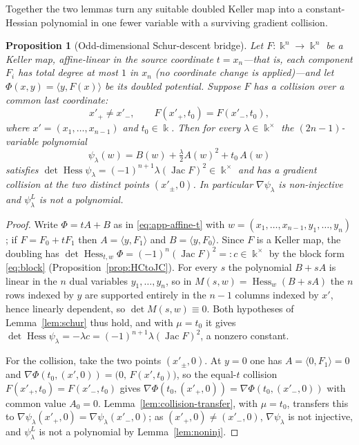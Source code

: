 \documentclass[11pt]{article}
\theoremstyle{plain}
\newtheorem{proposition}[theorem]{Proposition}
\theoremstyle{definition}
\newcommand{\kk}{\Bbbk}
\newcommand{\Hess}{\operatorname{Hess}}
\newcommand{\Jac}{\operatorname{Jac}}
\begin{document}
Together the two lemmas turn any suitable doubled Keller map into a
constant-Hessian polynomial in one fewer variable with a surviving
gradient collision.

\begin{proposition}[Odd-dimensional Schur-descent bridge]
\label{prop:bridge}
Let $F\colon\kk^{n}\to\kk^{n}$ be a Keller map, affine-linear in the
source coordinate $t=x_n$---that is, each component $F_i$ has total
degree at most $1$ in $x_n$ (no coordinate change is applied)---and let
$\Phi(x,y)=\langle y,F(x)\rangle$ be its doubled potential. Suppose $F$ has a collision over a common last
coordinate:
\[
x'_+\ne x'_-,\qquad F(x'_+,t_0)=F(x'_-,t_0),
\]
where $x'=(x_1,\dots,x_{n-1})$ and $t_0\in\kk$. Then for every
$\lambda\in\kk^{\times}$ the $(2n-1)$-variable polynomial
\[
\psi_{\lambda}(w)=B(w)+\tfrac{\lambda}{2}A(w)^{2}+t_0\,A(w)
\]
satisfies $\det\Hess\psi_{\lambda}=(-1)^{n+1}\lambda(\Jac F)^{2}
\in\kk^{\times}$ and has a gradient collision at the two distinct points
$(x'_\pm,0)$. In particular $\nabla\psi_{\lambda}$ is non-injective and
$\psi_{\lambda}^{L}$ is not a polynomial.
\end{proposition}

\begin{proof}
Write $\Phi=tA+B$ as in \eqref{eq:app-affine-t} with
$w=(x_1,\dots,x_{n-1},y_1,\dots,y_n)$; if $F=F_0+tF_1$ then
$A=\langle y,F_1\rangle$ and $B=\langle y,F_0\rangle$. Since $F$ is a
Keller map, the doubling has $\det\Hess_{t,w}\Phi=(-1)^{n}(\Jac F)^{2}
=:c\in\kk^{\times}$ by the block form \eqref{eq:block}
(Proposition~\ref{prop:HCtoJC}). For every $s$ the polynomial $B+sA$ is
linear in the $n$ dual variables $y_1,\dots,y_n$, so in
$M(s,w)=\Hess_w(B+sA)$ the $n$ rows indexed by $y$ are supported entirely
in the $n-1$ columns indexed by $x'$, hence linearly dependent, so
$\det M(s,w)\equiv0$.
Both hypotheses of Lemma~\ref{lem:schur} thus hold, and with $\mu=t_0$ it
gives $\det\Hess\psi_{\lambda}=-\lambda c=(-1)^{n+1}\lambda(\Jac F)^{2}$, a
nonzero constant.

For the collision, take the two points $(x'_\pm,0)$. At $y=0$ one has
$A=\langle0,F_1\rangle=0$ and
$\nabla\Phi(t_0,(x',0))=\bigl(0,\,F(x',t_0)\bigr)$, so the equal-$t$
collision $F(x'_+,t_0)=F(x'_-,t_0)$ gives
$\nabla\Phi(t_0,(x'_+,0))=\nabla\Phi(t_0,(x'_-,0))$ with common value
$A_0=0$. Lemma~\ref{lem:collision-transfer}, with $\mu=t_0$, transfers
this to $\nabla\psi_{\lambda}(x'_+,0)=\nabla\psi_{\lambda}(x'_-,0)$; as
$(x'_+,0)\ne(x'_-,0)$, $\nabla\psi_{\lambda}$ is not injective, and
$\psi_{\lambda}^{L}$ is not a polynomial by Lemma~\ref{lem:noninj}.
\end{proof}
\end{document}
